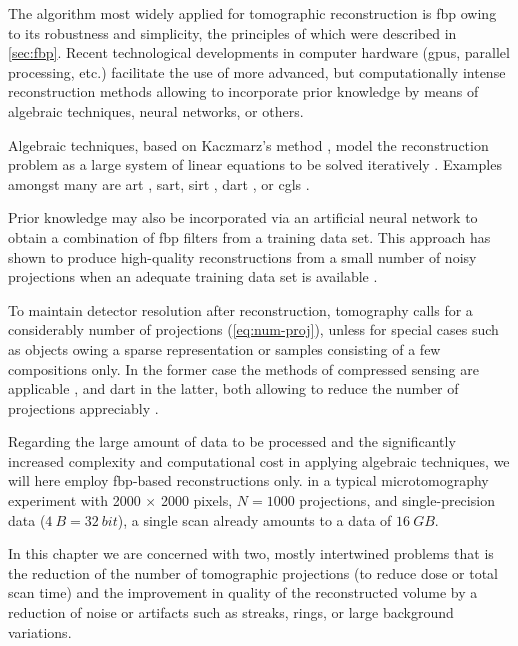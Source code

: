 \documentclass[
twoside,
openright,
titlepage,
numbers=noenddot,
headinclude,
fleqn,
a4paper,
footinclude=true,
cleardoublepage=empty,
abstractoff,
BCOR=5mm,
paper=a4,
fontsize=11pt,
british,ngerman,american,
]{scrreprt}
\begin{document}
The algorithm most widely applied for tomographic reconstruction is
\acf{fbp} owing to its robustness and simplicity, the principles of
which were described in \cref{sec:fbp}.  Recent technological
developments in computer hardware (\aclp{gpu}, parallel processing,
etc.) facilitate the use of more advanced, but computationally intense
reconstruction methods allowing to incorporate prior knowledge by
means of algebraic techniques, neural networks, or others.

Algebraic techniques, based on Kaczmarz's method \cite{Kaczmarz1937},
model the reconstruction problem as a large system of linear equations
to be solved iteratively \cite{KacSlaney}.  Examples amongst many are
\acf{art} \cite{Gordon1970}, \ac{sart}, \ac{sirt}
\cite{AndersenKac1984}, \ac{dart} \cite{Batenburg2011}, or \acf{cgls}
\cite{HestenesStiefel1952}.

Prior knowledge may also be incorporated via an artificial neural
network to obtain a combination of \ac{fbp} filters from a training
data set.  This approach has shown to produce high-quality
reconstructions from a small number of noisy projections when an
adequate training data set is available \cite{PeltBatenburg2013}.

To maintain detector resolution after reconstruction, tomography calls
for a considerably number of projections (\cref{eq:num-proj}), unless
for special cases such as objects owing a sparse representation or
samples consisting of a few compositions only.  In the former case the
methods of compressed sensing are applicable
\cite{Chen2008,Donoho2006}, and \ac{dart} in the latter, both allowing
to reduce the number of projections appreciably \cite{Batenburg2011}.

Regarding the large amount of data to be processed and the
significantly increased complexity and computational cost in applying
algebraic techniques, we will here employ \ac{fbp}-based
reconstructions only.  \Eg{} in a typical microtomography experiment
with 2000 $\times$ 2000 pixels, $N=1000$ projections, and
single-precision data ($\SI{4}{B}=\SI{32}{bit}$), a single scan
already amounts to a data of $\SI{16}{GB}$.

In this chapter we are concerned with two, mostly intertwined problems
that is the reduction of the number of tomographic projections (to
reduce dose or total scan time) and the improvement in quality of the
reconstructed volume by a reduction of noise or artifacts such as
streaks, rings, or large background variations.
\end{document}
